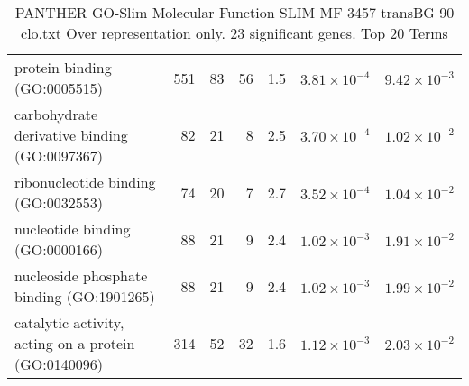 \begin{table}[ht]
\begin{adjustbox}{width=\textwidth}
\begin{tabular}{lrrrrrr}
  protein binding (GO:0005515) & 551 & 83 & 56 & 1.5 & $3.81 \times 10^{-4}$ & $9.42 \times 10^{-3}$ \\ 
  carbohydrate derivative binding (GO:0097367) & 82 & 21 & 8 & 2.5 & $3.70 \times 10^{-4}$ & $1.02 \times 10^{-2}$ \\ 
  ribonucleotide binding (GO:0032553) & 74 & 20 & 7 & 2.7 & $3.52 \times 10^{-4}$ & $1.04 \times 10^{-2}$ \\ 
  nucleotide binding (GO:0000166) & 88 & 21 & 9 & 2.4 & $1.02 \times 10^{-3}$ & $1.91 \times 10^{-2}$ \\ 
  nucleoside phosphate binding (GO:1901265) & 88 & 21 & 9 & 2.4 & $1.02 \times 10^{-3}$ & $1.99 \times 10^{-2}$ \\ 
  catalytic activity, acting on a protein (GO:0140096) & 314 & 52 & 32 & 1.6 & $1.12 \times 10^{-3}$ & $2.03 \times 10^{-2}$ \\ 
   \hline
\end{tabular}
\end{adjustbox}
\caption{PANTHER GO-Slim Molecular Function SLIM MF 3457 transBG 90 clo.txt Over representation only. 23 significant genes. Top 20 Terms} 
\label{tab:PANTHER GO-Slim Molecular Function SLIM MF 3457 transBG 90 clo.txt Over representation only. 23 significant genes. Top 20 Terms}
\end{table}



